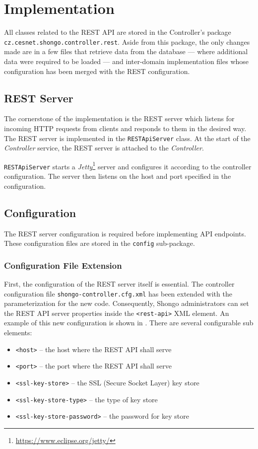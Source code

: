 \chapter{Implementation}
All classes related to the REST API are stored in the Controller’s package  \texttt{cz.cesnet.shongo.controller.rest}.
Aside from this package, the only changes made are in a few files that retrieve data from the database --- where additional data were required to be loaded --- and inter-domain implementation files\cite{pavelka2016shongo} whose configuration has been merged with the REST configuration.

\section{REST Server}
The cornerstone of the implementation is the REST server which listens for incoming HTTP requests from clients and responds to them in the desired way. The REST server is implemented in the \texttt{RESTApiServer} class.
At the start of the \emph{Controller} service, the REST server is attached to the \emph{Controller}.

\texttt{RESTApiServer} starts a \emph{Jetty}\footnote{\url{https://www.eclipse.org/jetty/}} server and configures it according to the controller configuration. The server then listens on the host and port specified in the configuration.

\section{Configuration}
The REST server configuration is required before implementing API endpoints. These configuration files are stored in the \texttt{config} sub-package.

\subsection{Configuration File Extension}
First, the configuration of the REST server itself is essential. The controller configuration file \texttt{shongo-controller.cfg.xml} has been extended with the parameterization for the new code. Consequently, Shongo administrators can set the REST API server properties inside the \texttt{<rest-api>} XML element. An example of this new configuration is shown in . There are several configurable sub elements:
\begin{itemize}
    \item \texttt{<host>} -- the host where the REST API shall serve
    \item \texttt{<port>} -- the port where the REST API shall serve
    \item \texttt{<ssl-key-store>} -- the SSL (Secure Socket Layer) key store
    \item \texttt{<ssl-key-store-type>} -- the type of key store
    \item \texttt{<ssl-key-store-password>} -- the password for key store
\end{itemize}

